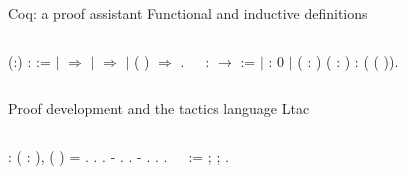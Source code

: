 \documentclass[t]{beamer}
\begin{document}
\begin{frame}{Coq: a proof assistant}
	Functional and inductive definitions
	\vskip 0.1in
	\begin{columns}
		\scriptsize
		\begin{coqdoccode}
			\coqdocnoindent
			  (:) :  :=\coqdoceol
			\coqdocindent{1.00em}
			  \coqdoceol
			\coqdocindent{2.00em}
			\ensuremath{|}  \ensuremath{\Rightarrow} \coqdoceol
			\coqdocindent{2.00em}
			\ensuremath{|}   \ensuremath{\Rightarrow} \coqdoceol
			\coqdocindent{2.00em}
			\ensuremath{|} \coqdocvar{S} ( ) \ensuremath{\Rightarrow}  \coqdoceol
			\coqdocindent{1.00em}
			.\coqdoceol
		\end{coqdoccode}
		\column{0.5\textwidth}
		\begin{coqdoccode}
			\coqdocnoindent
			  :  \ensuremath{\rightarrow}  :=\coqdoceol
			\coqdocindent{1.00em}
			\ensuremath{|}  :  0\coqdoceol
			\coqdocindent{1.00em}
			\ensuremath{|}  ( : ) ( :  ) :  (\coqdocvar{S} ( )).\coqdoceol
		\end{coqdoccode}
	\end{columns}

	\vskip 0.2in
	Proof development and the tactics language Ltac
	\vskip 0.1in
	\begin{columns}[T]
		\scriptsize
		\begin{coqdoccode}
			\coqdocemptyline
			\coqdocnoindent
			  : \coqdockw{\ensuremath{\forall}} ( : ),\coqdoceol
			\coqdocindent{1.00em}
			 ( \coqdocvar{b}) = .\coqdoceol
			\coqdocnoindent
			.\coqdoceol
			\coqdocindent{1.00em}
			 .\coqdoceol
			\coqdocindent{1.00em}
			- . .\coqdoceol
			\coqdocindent{1.00em}
			- . .\coqdoceol
			\coqdocnoindent
			.\coqdoceol
		\end{coqdoccode}
		\column{0.5\textwidth}
		\begin{coqdoccode}
			   :=\coqdoceol
			\coqdocindent{1.00em}
			 ; ; .\coqdoceol
		\end{coqdoccode}
	\end{columns}
\end{frame}
\end{document}
